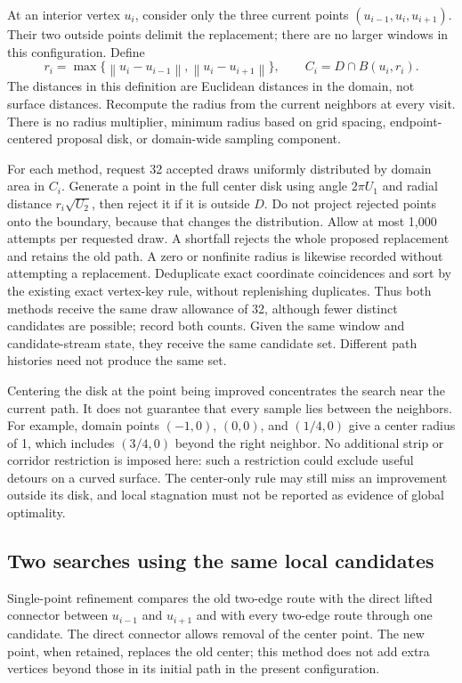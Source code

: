 \documentclass[11pt,letterpaper]{article}
\newcommand{\norm}[1]{\left\lVert#1\right\rVert}
\begin{document}
At an interior vertex $u_i$, consider only the three current points
$(u_{i-1},u_i,u_{i+1})$. Their two outside points delimit the replacement;
there are no larger windows in this configuration. Define
\begin{equation}\label{eq:center-disk}
 r_i=\max\{\norm{u_i-u_{i-1}},\norm{u_i-u_{i+1}}\},
 \qquad C_i=D\cap B(u_i,r_i).
\end{equation}
The distances in this definition are Euclidean distances in the domain, not
surface distances. Recompute the radius from the current neighbors at every
visit. There is no radius multiplier, minimum radius based on grid spacing,
endpoint-centered proposal disk, or domain-wide sampling component.

For each method, request 32 accepted draws uniformly distributed by domain
area in $C_i$. Generate a point in the full center disk using angle $2\pi U_1$
and radial distance $r_i\sqrt{U_2}$, then reject it if it is outside $D$.
Do not project rejected points onto the boundary, because that changes the
distribution. Allow at most 1,000 attempts per requested draw. A shortfall
rejects the whole proposed replacement and retains the old path. A zero or
nonfinite radius is likewise recorded without attempting a replacement.
Deduplicate exact coordinate coincidences and sort by the existing exact
vertex-key rule, without replenishing duplicates. Thus both methods receive
the same draw allowance of 32, although fewer distinct candidates are possible;
record both counts. Given the same window and candidate-stream state, they
receive the same candidate set. Different path histories need not produce
the same set.

Centering the disk at the point being improved concentrates the search near
the current path. It does not guarantee that every sample lies between the
neighbors. For example, domain points $(-1,0)$, $(0,0)$, and $(1/4,0)$ give a
center radius of 1, which includes $(3/4,0)$ beyond the right neighbor. No
additional strip or corridor restriction is imposed here: such a restriction
could exclude useful detours on a curved surface. The center-only rule may
still miss an improvement outside its disk, and local stagnation must not be
reported as evidence of global optimality.

\subsection{Two searches using the same local candidates}

Single-point refinement compares the old two-edge route with the direct lifted
connector between $u_{i-1}$ and $u_{i+1}$ and with every two-edge route through
one candidate. The direct connector allows removal of the center point. The
new point, when retained, replaces the old center; this method does not add
extra vertices beyond those in its initial path in the present configuration.
\end{document}

